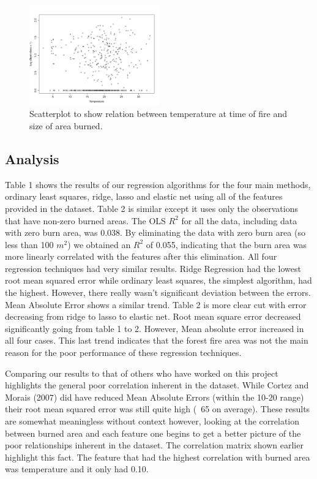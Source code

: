 \documentclass{article}
\begin{document}
\begin{figure}[!ht]
\begin{flushright}
\includegraphics[width=0.5\textwidth]{images/temperature.pdf}
\caption{Scatterplot to show relation between temperature at time of fire and size of area burned.}
\end{flushright}
\end{figure}

\subsection{Analysis}

Table 1 shows the results of our regression algorithms for the four main methods, ordinary least squares, ridge, lasso and elastic net using all of the features provided in the dataset. Table 2 is similar except it uses only the observations that have non-zero burned areas. The OLS $R^2$  for all the data, including data with zero burn area, was 0.038. By eliminating the data with zero burn area (so less than 100 $m^2$) we obtained an $R^2$ of 0.055, indicating that the burn area was more linearly correlated with the features after this elimination.  All four regression techniques had very similar results. Ridge Regression had the lowest root mean squared error while ordinary least squares, the simplest algorithm, had the highest. However, there really wasn’t significant deviation between the errors. Mean Absolute Error shows a similar trend. Table 2 is more clear cut with error decreasing from ridge to lasso to elastic net. Root mean square error decreased significantly going from table 1 to 2. However, Mean absolute error increased in all four cases. This last trend indicates that the forest fire area was not the main reason for the poor performance of these regression techniques.

Comparing our results to that of others who have worked on this project highlights the general poor correlation inherent in the dataset. While Cortez and Morais (2007) did have reduced Mean Absolute Errors (within the 10-20 range) their root mean squared error was still quite high (~65 on average). These results are somewhat meaningless without context however, looking at the correlation between burned area and each feature one begins to get a better picture of the poor relationships inherent in the dataset. The correlation matrix shown earlier highlight this fact. The feature that had the highest correlation with burned area was temperature and it only had 0.10. 
\end{document}
